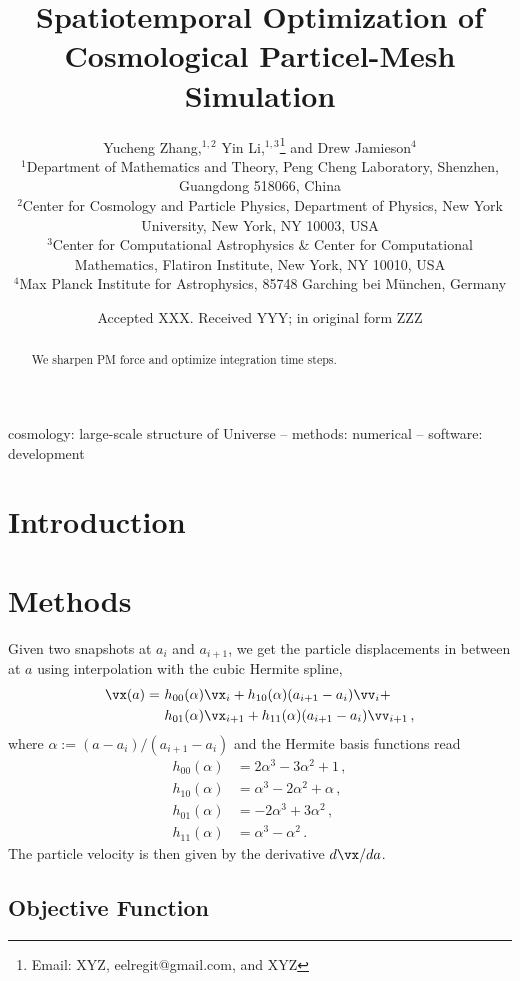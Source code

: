 \documentclass[usenatbib]{mnras}
\title[Spatiotemporally Optimized Simulation]
{Spatiotemporal Optimization of Cosmological Particel-Mesh Simulation}
\author[Zhang, Li, Jamieson, et al.]{
%
Yucheng Zhang,$^{1, 2}$
%
Yin Li,$^{1, 3}$\thanks{Email: XYZ, eelregit@gmail.com, and XYZ}
%
and Drew Jamieson$^{4}$
%
\\$^1$Department of Mathematics and Theory, Peng Cheng Laboratory,
Shenzhen, Guangdong 518066, China
%
\\$^2$Center for Cosmology and Particle Physics, Department of Physics,
New York University, New York, NY 10003, USA
%
\\$^3$Center for Computational Astrophysics \& Center for Computational
Mathematics, Flatiron Institute, New York, NY 10010, USA
%
\\$^4$Max Planck Institute for Astrophysics, 85748 Garching bei
M\"unchen, Germany
}
\date{Accepted XXX. Received YYY; in original form ZZZ}
\renewcommand{\d}{d}
\begin{document}
\label{firstpage}
\pagerange{\pageref{firstpage}--\pageref{lastpage}}
\maketitle



\begin{abstract}
We sharpen PM force and optimize integration time steps.
\end{abstract}

\begin{keywords}
cosmology: large-scale structure of Universe
-- methods: numerical
-- software: development
\end{keywords}



\section{Introduction}


\section{Methods}


Given two snapshots at $a_i$ and $a_{i+1}$, we get the particle displacements
in between at $a$ using interpolation with the cubic Hermite spline,
\begin{align}
  \vx(a) =\ &h_{00}(\alpha)\vx_i + h_{10}(\alpha)(a_{i+1} - a_i)\vv_i + \nonumber\\
           &h_{01}(\alpha)\vx_{i+1} + h_{11}(\alpha)(a_{i+1} - a_i)\vv_{i+1} \,,
\end{align}
where $\alpha := (a - a_i)/(a_{i+1} - a_i)$ and the Hermite basis functions read
\begin{align}
  h_{00}(\alpha) &= 2\alpha^3 - 3\alpha^2 + 1 \,,\nonumber\\
  h_{10}(\alpha) &= \alpha^3 - 2\alpha^2 + \alpha \,,\nonumber\\
  h_{01}(\alpha) &= -2\alpha^3 + 3\alpha^2 \,,\nonumber\\
  h_{11}(\alpha) &= \alpha^3 - \alpha^2 \,.
\end{align}
The particle velocity is then given by the derivative $\d\vx / \d a$.


\subsection{Objective Function}
\end{document}
